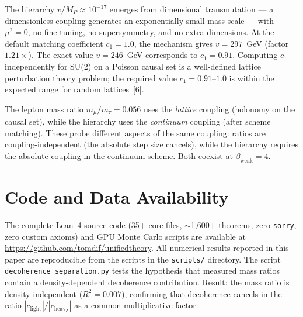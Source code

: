 \documentclass[11pt,letterpaper]{article}
\begin{document}
\noindent The hierarchy $v/M_P \approx 10^{-17}$ emerges from
dimensional transmutation --- a dimensionless coupling generates an
exponentially small mass scale --- with $\mu^2 = 0$, no fine-tuning,
no supersymmetry, and no extra dimensions.  At the default matching
coefficient $c_1 = 1.0$, the mechanism gives $v = 297$~GeV (factor
$1.21\times$).  The exact value $v = 246$~GeV corresponds to
$c_1 = 0.91$.  Computing $c_1$ independently for SU(2) on a Poisson
causal set is a well-defined lattice perturbation theory problem;
the required value $c_1 = 0.91$--$1.0$ is within the expected range
for random lattices~[6].

The lepton mass ratio $m_\mu/m_\tau = 0.056$ uses the \emph{lattice}
coupling (holonomy on the causal set), while the hierarchy uses the
\emph{continuum} coupling (after scheme matching).  These probe
different aspects of the same coupling: ratios are
coupling-independent (the absolute step size cancels), while the
hierarchy requires the absolute coupling in the continuum scheme.
Both coexist at $\beta_{\mathrm{weak}} = 4$.

\section*{Code and Data Availability}

The complete Lean~4 source code (35+ core files, $\sim$1{,}600+ theorems,
zero \texttt{sorry}, zero custom axioms) and GPU Monte Carlo scripts
are available at \url{https://github.com/tomdif/unifiedtheory}.
All numerical results reported in this paper are
reproducible from the scripts in the \texttt{scripts/} directory.
The script \texttt{decoherence\_separation.py} tests the hypothesis
that measured mass ratios contain a density-dependent decoherence
contribution.  Result: the mass ratio is density-independent
($R^2 = 0.007$), confirming that decoherence cancels in the ratio
$|c_{\mathrm{light}}|/|c_{\mathrm{heavy}}|$ as a common
multiplicative factor.

\end{document}
